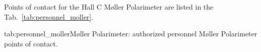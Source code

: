 {\begin{safetyen}{0}{0}

Points of contact for the Hall C M\o ller Polarimeter are listed in the Tab.~\ref{tab:personnel_moller}.

\begin{namestab}{tab:personnel_moller}{M\o ller Polarimeter: authorized personnel}{%
   M\o ller Polarimeter points of contact.}
\end{namestab}
\end{safetyen}
}
